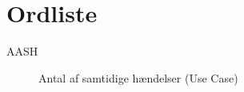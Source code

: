 \chapter{Ordliste}\label{head:ordliste}




\begin{description}

\item[AASH] Antal af samtidige hændelser (Use Case)

\end{description}